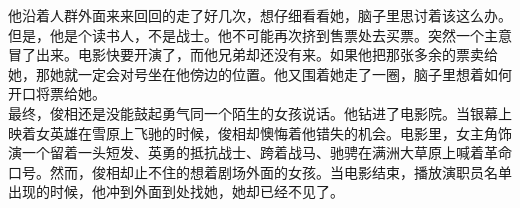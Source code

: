 \begin{multicols}{\theparacolNo}
他沿着人群外面来来回回的走了好几次，想仔细看看她，脑子里思讨着该这么办。但是，他是个读书人，不是战士。他不可能再次挤到售票处去买票。突然一个主意冒了出来。电影快要开演了，而他兄弟却还没有来。如果他把那张多余的票卖给她，那她就一定会对号坐在他傍边的位置。他又围着她走了一圈，脑子里想着如何开口将票给她。\\

最终，俊相还是没能鼓起勇气同一个陌生的女孩说话。他钻进了电影院。当银幕上映着女英雄在雪原上飞驰的时候，俊相却懊悔着他错失的机会。电影里，女主角饰演一个留着一头短发、英勇的抵抗战士、跨着战马、驰骋在满洲大草原上喊着革命口号。然而，俊相却止不住的想着剧场外面的女孩。当电影结束，播放演职员名单出现的时候，他冲到外面到处找她，她却已经不见了。\\
\ifnum{}
	\end{multicols}
\fi
